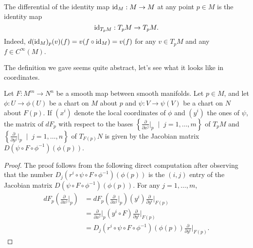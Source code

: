 \begin{rmk}
    The differential of the identity map $\operatorname{id}_M:M\to M$ at any point $p\in M$ is the identity map
    \begin{equation}
        \operatorname{id}_{T_pM}: T_pM \to T_pM.
    \end{equation}
    Indeed, $d (\operatorname{id}_M)_p(v)(f) = v(f\circ\operatorname{id}_M) = v(f)$ for any $v\in T_pM$ and any $f\in C^\infty(M)$.
\end{rmk}

The definition we gave seems quite abstract, let's see what it looks like in coordinates.

\begin{prop}\label{prop:DiffCoords}
    Let $F:M^m\to N^n$ be a smooth map between smooth manifolds.
    Let $p\in M$, and let $\phi : U \to \phi(U)$ be a chart on $M$ about $p$ and $\psi: V \to \psi(V)$ be a chart on $N$ about $F(p)$.
    If $(x^i)$ denote the local coordinates of $\phi$ and $(y^i)$ the ones of $\psi$, the matrix of $dF_p$ with respect to the bases $\left\{\frac{\partial}{\partial x^j}\big|_p \;\mid\; j=1,\ldots,m\right\}$ of $T_pM$ and $\left\{\frac{\partial}{\partial y^j}\big|_p \;\mid\; j=1,\ldots,n\right\}$ of $T_{F(p)}N$ is given by the Jacobian matrix $D(\psi\circ F \circ\phi^{-1})(\phi(p))$.
\end{prop}
\begin{proof}
    The proof follows from the following direct computation after observing that the number $D_j(r^i \circ \psi \circ F \circ \phi^{-1})(\phi(p))$ is the $(i,j)$ entry of the Jacobian matrix $D(\psi\circ F \circ\phi^{-1})(\phi(p))$. For any $j=1,\ldots,m$,
    \begin{align}
        dF_p \left(\frac{\partial}{\partial x^j}\Big|_p\right)
        &= %
          dF_p \left(\frac{\partial}{\partial x^j}\Big|_p\right) (y^i) \frac{\partial}{\partial y^i}\Big|_{F(p)} \\
        &= %
          \frac{\partial}{\partial x^j}\Big|_p (y^i \circ F) \frac{\partial}{\partial y^i}\Big|_{F(p)} \\
        &=%
          D_j(r^i \circ \psi \circ F \circ \phi^{-1})(\phi(p)) \frac{\partial}{\partial y^i}\Big|_{F(p)}.
    \end{align}
\end{proof}

